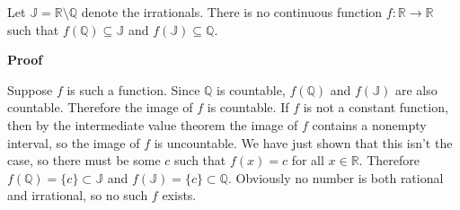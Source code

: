 \documentclass[12pt]{article}
\begin{document}
Let $\mathbb{J}=\mathbb{R}\setminus\mathbb{Q}$ denote the irrationals.
There is no continuous function $f\colon \mathbb{R} \to \mathbb{R}$
such that $f(\mathbb{Q})\subseteq \mathbb{J}$ and $f(\mathbb{J})\subseteq\mathbb{Q}$.

\textbf{Proof}

Suppose $f$ is such a function. Since $\mathbb{Q}$ is countable, $f(\mathbb{Q})$ and $f(\mathbb{J})$ are also countable. Therefore the image of $f$ is countable. If $f$ is not a constant function, then by the intermediate value theorem the image of $f$ contains a nonempty interval, so the image of $f$ is uncountable. We have just shown that this isn't the case, so there must be some $c$ such that $f(x)=c$ for all $x\in\mathbb{R}$. Therefore $f(\mathbb{Q})=\{c\}\subset\mathbb{J}$ and $f(\mathbb{J})=\{c\}\subset\mathbb{Q}$. Obviously no number is both rational and irrational, so no such $f$ exists.
\end{document}
